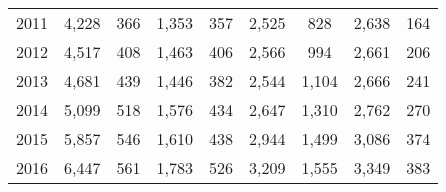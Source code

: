 \begin{table}[htbp]
\begin{tabular}{l*{8}{c}}
2011      &    4,228&      366&    1,353&      357&    2,525&      828&    2,638&      164\\
2012      &    4,517&      408&    1,463&      406&    2,566&      994&    2,661&      206\\
2013      &    4,681&      439&    1,446&      382&    2,544&    1,104&    2,666&      241\\
2014      &    5,099&      518&    1,576&      434&    2,647&    1,310&    2,762&      270\\
2015      &    5,857&      546&    1,610&      438&    2,944&    1,499&    3,086&      374\\
2016      &    6,447&      561&    1,783&      526&    3,209&    1,555&    3,349&      383\\
\hline\hline
\end{tabular}
\end{table}

